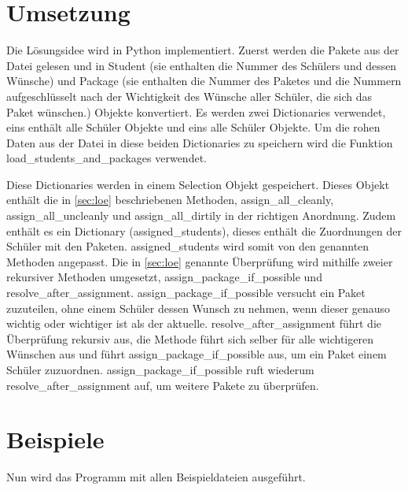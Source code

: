 \documentclass[a4paper,10pt,ngerman]{scrartcl}
\begin{document}
\section{Umsetzung}

Die Lösungsidee wird in Python implementiert.
Zuerst werden die Pakete aus der Datei gelesen und in Student (sie enthalten die Nummer des Schülers und dessen Wünsche) und Package (sie enthalten die Nummer des Paketes und die Nummern aufgeschlüsselt nach der Wichtigkeit des Wünsche aller Schüler, die sich das Paket wünschen.) Objekte konvertiert.
Es werden zwei Dictionaries verwendet, eins enthält alle Schüler Objekte und eins alle Schüler Objekte.
Um die rohen Daten aus der Datei in diese beiden Dictionaries zu speichern wird die Funktion load\_students\_and\_packages verwendet.

Diese Dictionaries werden in einem Selection Objekt gespeichert.
Dieses Objekt enthält die in \autoref{sec:loe} beschriebenen Methoden, assign\_all\_cleanly, assign\_all\_uncleanly und assign\_all\_dirtily in der richtigen Anordnung.
Zudem enthält es ein Dictionary (assigned\_students), dieses enthält die Zuordnungen der Schüler mit den Paketen.
assigned\_students wird somit von den genannten Methoden angepasst.
Die in \autoref{sec:loe} genannte Überprüfung wird mithilfe zweier rekursiver Methoden umgesetzt, assign\_package\_if\_possible und resolve\_after\_assignment.
assign\_package\_if\_possible versucht ein Paket zuzuteilen, ohne einem Schüler dessen Wunsch zu nehmen, wenn dieser genauso wichtig oder wichtiger ist als der aktuelle.
resolve\_after\_assignment führt die Überprüfung rekursiv aus, die Methode führt sich selber für alle wichtigeren Wünschen aus und führt assign\_package\_if\_possible aus, um ein Paket einem Schüler zuzuordnen.
assign\_package\_if\_possible ruft wiederum resolve\_after\_assignment auf, um weitere Pakete zu überprüfen.

\section{Beispiele}

Nun wird das Programm mit allen Beispieldateien ausgeführt.
\end{document}
